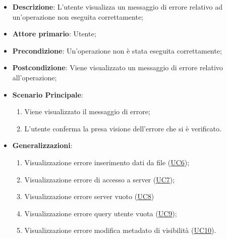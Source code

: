 \begin{itemize}
    \item \textbf{Descrizione}: L'utente visualizza un messaggio di errore relativo ad un'operazione non eseguita 
    correttamente;

    \item \textbf{Attore primario}: Utente;
    
    \item \textbf{Precondizione}:   Un'operazione non è stata eseguita correttamente; 

    \item \textbf{Postcondizione}:  Viene visualizzato un messaggio di errore relativo all'operazione;
    
    \item \textbf{Scenario Principale}:
    \begin{enumerate}
        \item Viene visualizzato il messaggio di errore;
        \item L'utente conferma la presa visione dell'errore che si è verificato.
    \end{enumerate}

    \item \textbf{Generalizzazioni}:
    \begin{enumerate}
        \item Visualizzazione errore inserimento dati da file (\hyperref[sub:uc6]{UC6});
        \item Visualizzazione errore di accesso a server (\hyperref[sub:uc7]{UC7});
        \item Visualizzazione errore server vuoto (\hyperref[sub:uc8]{UC8})
        \item Visualizzazione errore query utente vuota (\hyperref[sub:uc9]{UC9});
        \item Visualizzazione errore modifica metadato di visibilità (\hyperref[sub:uc10]{UC10}).
    \end{enumerate}

\end{itemize}


